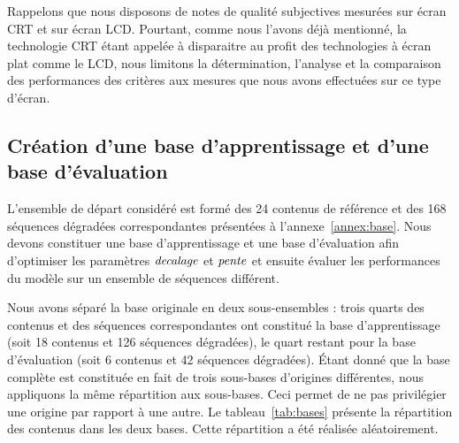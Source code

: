 Rappelons que nous disposons de notes de qualité subjectives mesurées sur écran CRT et sur écran LCD. Pourtant, comme nous l'avons déjà mentionné, la technologie CRT étant appelée à disparaitre au profit des technologies à écran plat comme le LCD, nous limitons la détermination, l'analyse et la comparaison des performances des critères aux mesures que nous avons effectuées sur ce type d'écran.


\subsection{Création d'une base d'apprentissage et d'une base d'évaluation}
L'ensemble de départ considéré est formé des 24 contenus de référence et des 168 séquences dégradées correspondantes présentées à l'annexe~\ref{annex:base}. Nous devons constituer une base d'apprentissage et une base d'évaluation afin d'optimiser les paramètres $\mathit{decalage}$ et $\mathit{pente}$ et ensuite évaluer les performances du modèle sur un ensemble de séquences différent.

Nous avons séparé la base originale en deux sous-ensembles : trois quarts des contenus et des séquences correspondantes ont constitué la base d'apprentissage (soit 18 contenus et 126 séquences dégradées), le quart restant pour la base d'évaluation (soit 6 contenus et 42 séquences dégradées). Étant donné que la base complète est constituée en fait de trois sous-bases d'origines différentes, nous appliquons la même répartition aux sous-bases. Ceci permet de ne pas privilégier une origine par rapport à une autre. Le tableau~\ref{tab:bases} présente la répartition des contenus dans les deux bases. Cette répartition a été réalisée aléatoirement.

